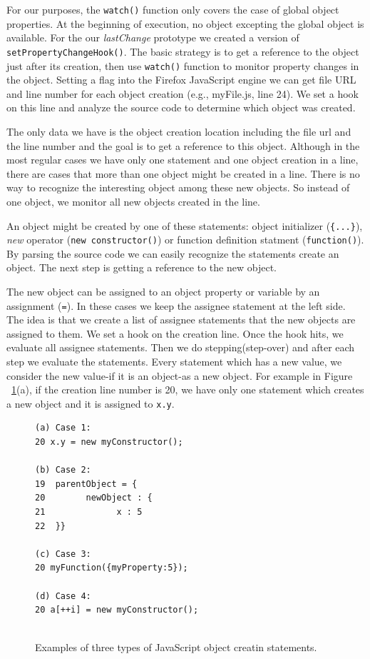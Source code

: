 \documentclass[preprint]{sigplanconf}
\begin{document}
For our purposes, the \texttt{watch()} function only covers the case
of global object properties. At the beginning of execution, no object
excepting the global object is available.  For 
the our \textit{lastChange} prototype we created a version of
\texttt{setPropertyChangeHook()}.  The basic strategy is to get a reference to the object just
after its creation, then use \texttt{watch()} function to monitor
property changes in the object.  Setting a flag\cite{JSD} into the Firefox
JavaScript engine we can get file URL and line number for each object
creation (e.g., myFile.js, line 24). We set a hook on this line
and analyze the source code to determine which object was created.

The only data we have is the object creation location including the
file url and the line number and the goal is to get a reference to
this object. Although in the most regular cases we have only one
statement and one object creation in a line, there are cases that more
than one object might be created in a line. There is no way to
recognize the interesting object among these new objects. So instead
of one object, we monitor all new objects created in the line.

An object might be created by one of these statements: object
initializer (\texttt{\{...\}}), \textit{new} operator (\texttt{new 
constructor()}) or function definition statment (\texttt{function()}). 
By parsing the source code we can easily recognize the statements 
create an object. The next step is getting a reference to the new object.

The new object can be assigned to an object property or variable by
an assignment (\texttt{=}). In these cases we keep the assignee statement 
at the left side. The idea is that we create a list of assignee statements 
that the new objects are assigned to them. We set a hook on the creation
line. Once the hook hits, we evaluate all assignee statements. Then 
we do stepping(step-over) and after each step we evaluate the
statements. Every statement which has a new value, we consider the new
value-if it is an object-as a new object. For example in Figure
~\ref{fig:objectCreation}(a), if the creation line number is 20, we
have only one statement which creates a new object and it is assigned
to \texttt{x.y}.


\begin{figure}[htp]
\begin{verbatim}
(a) Case 1:
20 x.y = new myConstructor();

(b) Case 2:
19  parentObject = {
20   	  newObject : {
21  			x : 5
22  }}

(c) Case 3:
20 myFunction({myProperty:5});

(d) Case 4:
20 a[++i] = new myConstructor();
 
\end{verbatim}
\caption{Examples of three types of JavaScript object creatin statements.}
\label{fig:objectCreation}
\end{figure}
\end{document}
